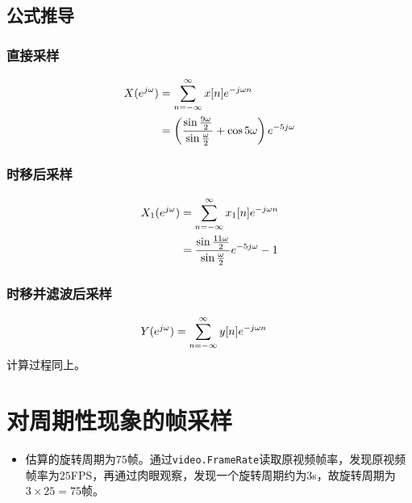 \documentclass[UTF8,a4paper,12pt]{ctexart}
\begin{document}
\begin{figure}[H]   %
\centering
\end{figure}

\subsection{公式推导}
\subsubsection{直接采样}
\begin{align}
	X(e^{j\omega}) &= \sum_{n=-\infty}^{\infty}x[n]e^{-j\omega n} \notag \\
	 				&= \left(\frac{\sin{\frac{9\omega}{2}}}{\sin{\frac{\omega}{2}}}+\cos5\omega\right)e^{-5j\omega} \notag
\end{align}

\subsubsection{时移后采样}
\begin{align}
	X_1(e^{j\omega}) &= \sum_{n=-\infty}^{\infty}x_1[n]e^{-j\omega n} \notag \\
	 				&= \frac{\sin{\frac{11\omega}{2}}}{\sin{\frac{\omega}{2}}}e^{-5j\omega} - 1 \notag
\end{align}

\subsubsection{时移并滤波后采样}
\begin{align}
	Y(e^{j\omega}) &= \sum_{n=-\infty}^{\infty}y[n]e^{-j\omega n} \notag
\end{align}
计算过程同上。
 
\section{对周期性现象的帧采样}
\begin{itemize}
  \item 估算的旋转周期为$75$帧。通过\verb|video.FrameRate|读取原视频帧率，发现原视频帧率为$25$FPS，再通过肉眼观察，发现一个旋转周期约为$3$s，故旋转周期为$3\times 25=75$帧。
\end{itemize}
\end{document}
